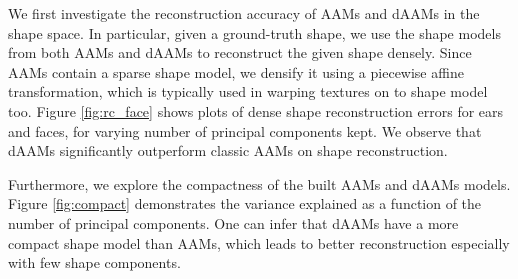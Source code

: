 We first investigate the reconstruction accuracy of AAMs and dAAMs in the shape space. In particular, given a ground-truth shape, we use the shape models from both AAMs and dAAMs to reconstruct the given shape densely. Since AAMs contain a sparse shape model, we densify it using a piecewise affine transformation, which is typically used in warping textures on to shape model too. Figure \ref{fig:rc_face} shows plots of dense shape reconstruction errors for ears and faces, for varying number of principal components kept. We observe that dAAMs significantly outperform classic AAMs on shape reconstruction.


Furthermore, we explore the compactness of the built AAMs and dAAMs models.
Figure \ref{fig:compact} demonstrates the variance explained as a function of the number of principal components. One can infer that dAAMs have a more compact shape model than AAMs, which leads to better reconstruction especially with few shape components.


